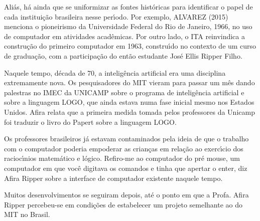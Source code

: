 \documentclass[
12pt,		%
openright,	%
twoside,  %
a4paper,			%
chapter=TITLE,		%
english,			%
french,				%
spanish,			%
brazil				%
]{USPSC-classe/USPSC}
\begin{document}
Ali\'as, h\'a ainda que se uniformizar as fontes hist\'oricas para identificar o papel de cada institui\c{c}\~ao brasileira nesse per\'{\i}odo. Por exemplo,  ALVAREZ (2015) menciona o pioneirismo da Universidade Federal do Rio de Janeiro, 1966, no uso de computador em atividades acad\^emicas. Por outro lado, o ITA reinvindica a constru\c{c}\~ao do primeiro computador em 1963, constru\'{\i}do no contexto de um curso de gradua\c{c}\~ao, com a participa\c{c}\~ao do ent\~ao estudante Jos\'e Ellis Ripper Filho.

















Naquele tempo, d\'ecada de 70, a intelig\^encia artificial era uma disciplina extremamente nova. Os pesquisadores do MIT vieram para passar um m\^es dando palestras no IMEC da UNICAMP sobre o programa de intelig\^encia artificial e sobre a linguagem LOGO, que ainda estava numa fase inicial mesmo nos Estados Unidos. Afira relata que a primeira medida tomada pelos professores da Unicamp foi traduzir o livro do Papert sobre a linguagem LOGO.

















Os professores brasileiros j\'a estavam contaminados pela ideia de que o trabalho com o computador poderia empoderar as crian\c{c}as em rela\c{c}\~ao ao exerc\'{\i}cio dos racioc\'{\i}nios matem\'atico e l\'ogico. \textquotedbl Refiro-me ao computador do pr\'e mouse, um computador em que voc\^e digitava os comandos e tinha que apertar o enter\textquotedbl , diz Afira Ripper sobre a interface de computador existente naquele tempo.

















Muitos desenvolvimentos se seguiram depois, at\'e o ponto em que a Profa. Afira Ripper percebeu-se em condi\c{c}\~oes de estabelecer um projeto semelhante ao do MIT no Brasil.
\end{document}
